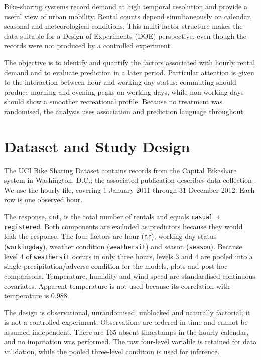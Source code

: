 \documentclass[12pt]{article}
\begin{document}
Bike-sharing systems record demand at high temporal resolution and provide a
useful view of urban mobility. Rental counts depend simultaneously on calendar,
seasonal and meteorological conditions. This multi-factor structure makes the
data suitable for a Design of Experiments (DOE) perspective, even though the
records were not produced by a controlled experiment.

The objective is to identify and quantify the factors associated with hourly
rental demand and to evaluate prediction in a later period. Particular attention
is given to the interaction between hour and working-day status: commuting
should produce morning and evening peaks on working days, while non-working days
should show a smoother recreational profile. Because no treatment was
randomised, the analysis uses association and prediction language throughout.

\section{Dataset and Study Design}

The UCI Bike Sharing Dataset \cite{uci-bike-sharing} contains records from the
Capital Bikeshare system in Washington, D.C.; the associated publication
describes data collection \cite{fanaee2013}. We use the hourly file, covering
1 January 2011 through 31 December 2012. Each row is one observed hour.

The response, \texttt{cnt}, is the total number of rentals and equals
\texttt{casual + registered}. Both components are excluded as predictors because
they would leak the response. The four factors are hour (\texttt{hr}),
working-day status (\texttt{workingday}), weather condition (\texttt{weathersit})
and season (\texttt{season}). Because level 4 of \texttt{weathersit} occurs in
only three hours, levels 3 and 4 are pooled into a single precipitation/adverse
condition for the models, plots and post-hoc comparisons. Temperature, humidity and wind speed are
standardised continuous covariates. Apparent temperature is not used because its
correlation with temperature is 0.988.

The design is observational, unrandomised, unblocked and naturally factorial; it
is not a controlled experiment. Observations are ordered in time and cannot be
assumed independent. There are 165 absent timestamps in the hourly calendar, and
no imputation was performed. The raw four-level variable is retained for data
validation, while the pooled three-level condition is used for inference.
\end{document}

